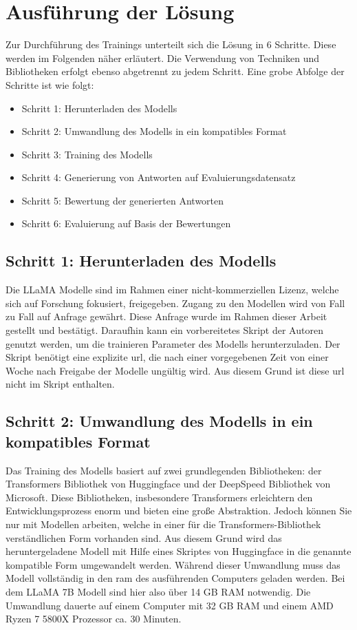 \chapter{Ausführung der Lösung}\label{ch:solution}

Zur Durchführung des Trainings unterteilt sich die Lösung in 6 Schritte.
Diese werden im Folgenden näher erläutert. Die Verwendung von Techniken und Bibliotheken erfolgt ebenso abgetrennt zu jedem Schritt.
Eine grobe Abfolge der Schritte ist wie folgt:
\begin{itemize}
    \item Schritt 1: Herunterladen des Modells
    \item Schritt 2: Umwandlung des Modells in ein kompatibles Format
    \item Schritt 3: Training des Modells
    \item Schritt 4: Generierung von Antworten auf Evaluierungsdatensatz
    \item Schritt 5: Bewertung der generierten Antworten
    \item Schritt 6: Evaluierung auf Basis der Bewertungen
\end{itemize}

\section{Schritt 1: Herunterladen des Modells}
Die LLaMA Modelle sind im Rahmen einer nicht-kommerziellen Lizenz, welche sich auf Forschung fokusiert, freigegeben. Zugang zu den Modellen wird von Fall zu Fall auf Anfrage gewährt. Diese Anfrage wurde im Rahmen dieser Arbeit gestellt und bestätigt.
Daraufhin kann ein vorbereitetes Skript der Autoren genutzt werden, um die trainieren Parameter des Modells herunterzuladen.
Der Skript benötigt eine explizite \ac{url}, die nach einer vorgegebenen Zeit von einer Woche nach Freigabe der Modelle ungültig wird. Aus diesem Grund ist diese \ac{url} nicht im Skript enthalten.

\section{Schritt 2: Umwandlung des Modells in ein kompatibles Format}
Das Training des Modells basiert auf zwei grundlegenden Bibliotheken: der Transformers Bibliothek von Huggingface und der DeepSpeed Bibliothek von Microsoft.
Diese Bibliotheken, insbesondere Transformers erleichtern den Entwicklungsprozess enorm und bieten eine große Abstraktion. Jedoch können Sie nur mit Modellen arbeiten, welche in einer für die Transformers-Bibliothek verständlichen Form vorhanden sind.
Aus diesem Grund wird das heruntergeladene Modell mit Hilfe eines Skriptes von Huggingface in die genannte kompatible Form umgewandelt werden.
Während dieser Umwandlung muss das Modell vollständig in den \ac{ram} des ausführenden Computers geladen werden. Bei dem LLaMA 7B Modell sind hier also über 14 GB RAM notwendig.
Die Umwandlung dauerte auf einem Computer mit 32 GB RAM und einem AMD Ryzen 7 5800X Prozessor ca. 30 Minuten.

